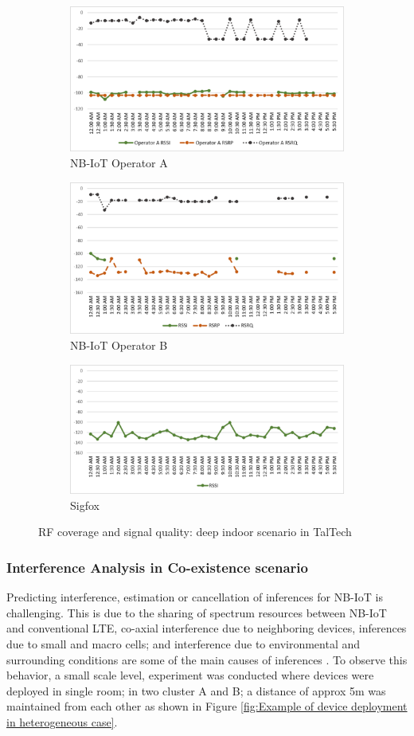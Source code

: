 \documentclass[12pt]{article}
\begin{document}
 \begin{figure}[h!]
\begin{subfigure}[t]{\linewidth}
  \centering
  \includegraphics[width=.5\linewidth]{Images/tallinn/ATallinnDeepIndoor.pdf}  
  \caption{NB-IoT Operator A}
\end{subfigure}
\begin{subfigure}[t]{\linewidth}
  \centering
  \includegraphics[width=.5\linewidth]{Images/tallinn/BTallinnDeepIndoor.pdf}  
  \caption{NB-IoT Operator B}
  
\end{subfigure}
\begin{subfigure}[t]{\linewidth}
  \centering
  \includegraphics[width=.5\linewidth]{Images/tallinn/STallinnDeepIndoor.pdf}  
\caption{Sigfox}
 \end{subfigure}
\caption{RF coverage and signal quality: deep indoor scenario in TalTech}
 \label{RFDeepIndoorTallinn}
\end{figure}


\newpage \subsubsection{Interference Analysis in Co-existence scenario} \label{interferenceExp}
Predicting interference, estimation or cancellation of inferences for NB-IoT is challenging. This is due to the sharing of spectrum resources between NB-IoT and conventional LTE, co-axial interference due to neighboring devices, inferences due to small and macro cells; and interference due to environmental and surrounding conditions are some of the main causes of inferences \cite{mwakwata2019narrowband}. To observe this behavior, a small scale level, experiment was conducted where devices were deployed in single room; in two cluster A and B; a distance of approx 5m was maintained from each other as shown in Figure \ref{fig:Example of device deployment in heterogeneous case}.
\end{document}
